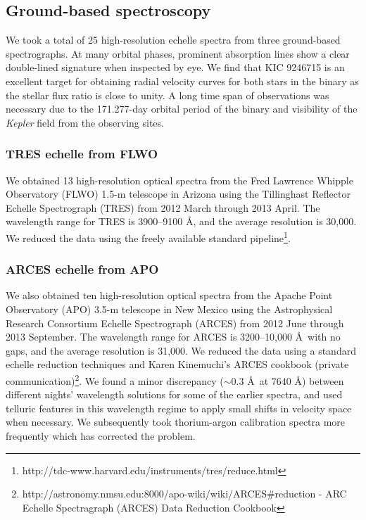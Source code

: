 \subsection{Ground-based spectroscopy}\label{spectra}
We took a total of 25 high-resolution echelle spectra from three ground-based spectrographs. At many orbital phases, prominent absorption lines show a clear double-lined signature when inspected by eye. We find that KIC 9246715 is an excellent target for obtaining radial velocity curves for both stars in the binary as the stellar flux ratio is close to unity. A long time span of observations was necessary due to the 171.277-day orbital period of the binary and visibility of the \emph{Kepler} field from the observing sites.

\subsubsection{TRES echelle from FLWO}\label{tres}
We obtained 13 high-resolution optical spectra from the Fred Lawrence Whipple Observatory (FLWO) 1.5-m telescope in Arizona using the Tillinghast Reflector Echelle Spectrograph (TRES) from 2012 March through 2013 April. The wavelength range for TRES is 3900--9100 \AA, and the average resolution is 30,000. We reduced the data using the freely available standard pipeline\footnote{http://tdc-www.harvard.edu/instruments/tres/reduce.html}.

\subsubsection{ARCES echelle from APO}\label{arces}
We also obtained ten high-resolution optical spectra from the Apache Point Observatory (APO) 3.5-m telescope in New Mexico using the Astrophysical Research Consortium Echelle Spectrograph (ARCES) from 2012 June through 2013 September. The wavelength range for ARCES is 3200--10,000 \AA \ with no gaps, and the average resolution is 31,000. We reduced the data using a standard echelle reduction techniques and Karen Kinemuchi's ARCES cookbook (private communication)\footnote{http://astronomy.nmsu.edu:8000/apo-wiki/wiki/ARCES#reduction - ARC Echelle Spectragraph (ARCES) Data Reduction Cookbook}. We found a minor discrepancy ($\sim 0.3$ \AA \ at $7640$ \AA) between different nights' wavelength solutions for some of the earlier spectra, and used telluric features in this wavelength regime to apply small shifts in velocity space when necessary. We subsequently took thorium-argon calibration spectra more frequently which has corrected the problem.

